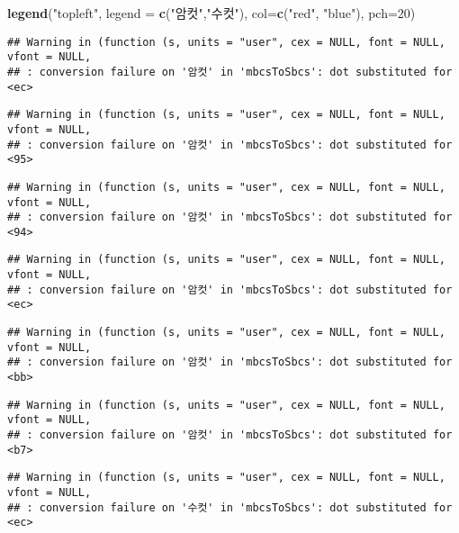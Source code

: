 \documentclass[
]{article}
\newenvironment{Shaded}{\begin{snugshade}}{\end{snugshade}}
\newcommand{\AttributeTok}[1]{\textcolor[rgb]{0.13,0.29,0.53}{#1}}
\newcommand{\DecValTok}[1]{\textcolor[rgb]{0.00,0.00,0.81}{#1}}
\newcommand{\FunctionTok}[1]{\textcolor[rgb]{0.13,0.29,0.53}{\textbf{#1}}}
\newcommand{\NormalTok}[1]{#1}
\newcommand{\StringTok}[1]{\textcolor[rgb]{0.31,0.60,0.02}{#1}}
\begin{document}
\begin{Shaded}
\begin{Highlighting}[]
\FunctionTok{legend}\NormalTok{(}\StringTok{"topleft"}\NormalTok{, }\AttributeTok{legend =} \FunctionTok{c}\NormalTok{(}\StringTok{"암컷"}\NormalTok{,}\StringTok{"수컷"}\NormalTok{), }\AttributeTok{col=}\FunctionTok{c}\NormalTok{(}\StringTok{"red"}\NormalTok{, }\StringTok{"blue"}\NormalTok{), }\AttributeTok{pch=}\DecValTok{20}\NormalTok{)}
\end{Highlighting}
\end{Shaded}

\begin{verbatim}
## Warning in (function (s, units = "user", cex = NULL, font = NULL, vfont = NULL,
## : conversion failure on '암컷' in 'mbcsToSbcs': dot substituted for <ec>
\end{verbatim}

\begin{verbatim}
## Warning in (function (s, units = "user", cex = NULL, font = NULL, vfont = NULL,
## : conversion failure on '암컷' in 'mbcsToSbcs': dot substituted for <95>
\end{verbatim}

\begin{verbatim}
## Warning in (function (s, units = "user", cex = NULL, font = NULL, vfont = NULL,
## : conversion failure on '암컷' in 'mbcsToSbcs': dot substituted for <94>
\end{verbatim}

\begin{verbatim}
## Warning in (function (s, units = "user", cex = NULL, font = NULL, vfont = NULL,
## : conversion failure on '암컷' in 'mbcsToSbcs': dot substituted for <ec>
\end{verbatim}

\begin{verbatim}
## Warning in (function (s, units = "user", cex = NULL, font = NULL, vfont = NULL,
## : conversion failure on '암컷' in 'mbcsToSbcs': dot substituted for <bb>
\end{verbatim}

\begin{verbatim}
## Warning in (function (s, units = "user", cex = NULL, font = NULL, vfont = NULL,
## : conversion failure on '암컷' in 'mbcsToSbcs': dot substituted for <b7>
\end{verbatim}

\begin{verbatim}
## Warning in (function (s, units = "user", cex = NULL, font = NULL, vfont = NULL,
## : conversion failure on '수컷' in 'mbcsToSbcs': dot substituted for <ec>
\end{verbatim}
\end{document}
